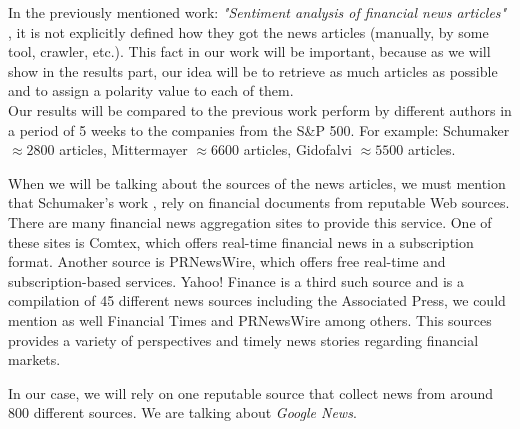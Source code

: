 In the previously mentioned work: \emph{"Sentiment analysis of financial news articles"} \cite{SCH2012}, it is not explicitly defined how they got the news articles (manually, by some tool, crawler, etc.). This fact in our work will be important, because as we will show in the results part, our idea will be to retrieve as much articles as possible and to assign a polarity value to each of them. \\

Our results will be compared to the previous work perform by different authors in a period of 5 weeks to the companies from the S\&P 500. For example: Schumaker  \begin{math}\approx 2800\end{math} articles, Mittermayer \begin{math}\approx 6600\end{math} articles, Gidofalvi \begin{math}\approx 5500\end{math} articles.

When we will be talking about the sources of the news articles, we must mention that Schumaker's work \cite{SCH2012}, rely on financial documents from reputable Web sources. There are many financial news aggregation sites to provide this service. One of these sites is Comtex, which offers real-time financial news in a subscription format. Another source is PRNewsWire, which offers free real-time and subscription-based services. Yahoo! Finance is a third such source and is a compilation of 45 different news sources including the Associated Press, we could mention as well Financial Times and PRNewsWire among others. This sources provides a variety of perspectives and timely news stories regarding financial markets.

In our case, we will rely on one reputable source that collect news from around 800 different sources. We are talking about \emph{Google News}.
